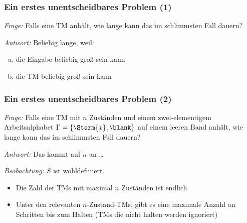 \documentclass[onlymath]{beamer}
\begin{document}
\begin{frame}[t]\frametitle{Ein erstes unentscheidbares Problem (1)}

\emph{Frage:} Falls eine TM anhält, wie lange kann das im schlimmsten Fall dauern?\\
\bigskip\pause

\emph{Antwort:} Beliebig lange, weil:
\begin{enumerate}[(a)]
\item die Eingabe beliebig groß sein kann
\item die TM beliebig groß sein kann
\end{enumerate}

\end{frame}

\begin{frame}[t]\frametitle{Ein erstes unentscheidbares Problem (2)}

\emph{Frage:} Falls eine TM \alert{mit $n$ Zuständen} und \alert{einem zwei-elementigem Arbeitsalphabet $\Gamma=\{\Sterm{x}, \blank\}$} auf einem \alert{leeren Band} anhält, wie lange kann das im schlimmsten Fall dauern?\\
\bigskip\pause

\emph{Antwort:} Das kommt auf $n$ an \ldots\bigskip\pause


\emph{Beobachtung:} $S$ ist wohldefiniert.
\begin{itemize}
\item Die Zahl der TMs mit maximal $n$ Zuständen ist endlich
\item Unter den relevanten $n$-Zustand-TMs, gibt es eine maximale Anzahl an Schritten bis zum Halten (TMs die nicht halten werden ignoriert)
\end{itemize}

\end{frame}
\end{document}

